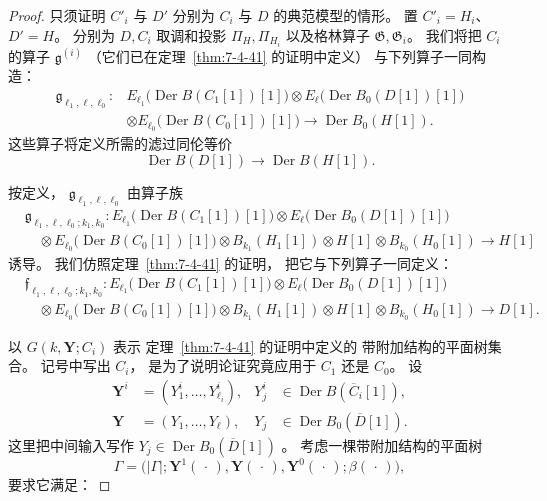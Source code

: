 \begin{proof}
只须证明 $C'_i$ 与 $D'$
分别为 $C_i$ 与 $D$ 的典范模型的情形。
置 $C'_i=H_i$、$D'=H$。
分别为 $D,C_i$ 取调和投影
$\Pi_H,\Pi_{H_i}$ 以及格林算子
$\mathfrak G,\mathfrak G_i$。
我们将把 $C_i$ 的算子
$\mathfrak g^{(i)}$
（它们已在定理~\ref{thm:7-4-41} 的证明中定义）
与下列算子一同构造：
\begin{equation}
\begin{aligned}
\mathfrak g_{\ell_1,\ell,\ell_0}\colon&
E_{\ell_1}\bigl(\operatorname{Der}B(C_1[1])[1]\bigr)
\otimes
E_\ell\bigl(\operatorname{Der}B_0(D[1])[1]\bigr)\\
&\otimes
E_{\ell_0}\bigl(\operatorname{Der}B(C_0[1])[1]\bigr)
\longrightarrow
\operatorname{Der}B_0(H[1]).
\end{aligned}
\tag{7.4.150}\label{eq:7-4-150}
\end{equation}
这些算子将定义所需的滤过同伦等价
\[
\operatorname{Der}B(D[1])
\longrightarrow
\operatorname{Der}B(H[1]).
\]

按定义，
$\mathfrak g_{\ell_1,\ell,\ell_0}$
由算子族
\begin{equation}
\begin{aligned}
&\mathfrak g_{\ell_1,\ell,\ell_0;k_1,k_0}\colon
E_{\ell_1}\bigl(\operatorname{Der}B(C_1[1])[1]\bigr)
\otimes
E_\ell\bigl(\operatorname{Der}B_0(D[1])[1]\bigr)\\
&\quad\otimes
E_{\ell_0}\bigl(\operatorname{Der}B(C_0[1])[1]\bigr)
\otimes B_{k_1}(H_1[1])
\otimes H[1]\otimes B_{k_0}(H_0[1])
\longrightarrow H[1]
\end{aligned}
\tag{7.4.151.1}\label{eq:7-4-151-1}
\end{equation}
诱导。
我们仿照定理~\ref{thm:7-4-41} 的证明，
把它与下列算子一同定义：
\begin{equation}
\begin{aligned}
&\mathfrak f_{\ell_1,\ell,\ell_0;k_1,k_0}\colon
E_{\ell_1}\bigl(\operatorname{Der}B(C_1[1])[1]\bigr)
\otimes
E_\ell\bigl(\operatorname{Der}B_0(D[1])[1]\bigr)\\
&\quad\otimes
E_{\ell_0}\bigl(\operatorname{Der}B(C_0[1])[1]\bigr)
\otimes B_{k_1}(H_1[1])
\otimes H[1]\otimes B_{k_0}(H_0[1])
\longrightarrow D[1].
\end{aligned}
\tag{7.4.151.2}\label{eq:7-4-151-2}
\end{equation}

以 $G(k,\mathbf Y;C_i)$ 表示
定理~\ref{thm:7-4-41} 的证明中定义的
带附加结构的平面树集合。
记号中写出 $C_i$，
是为了说明论证究竟应用于 $C_1$ 还是 $C_0$。
设
\[
\begin{aligned}
\mathbf Y^i
&=(Y^i_1,\ldots,Y^i_{\ell_i}),
&Y^i_j&\in
\operatorname{Der}B(\overline C_i[1]),\\
\mathbf Y
&=(Y_1,\ldots,Y_\ell),
&Y_j&\in
\operatorname{Der}B_0(\overline D[1]).
\end{aligned}
\]
这里把中间输入写作
$Y_j\in\operatorname{Der}B_0(\overline D[1])$
。
考虑一棵带附加结构的平面树
\[
\Gamma=
\bigl(
|\Gamma|;
\mathbf Y^1(\,\cdot\,),
\mathbf Y(\,\cdot\,),
\mathbf Y^0(\,\cdot\,);
\beta(\,\cdot\,)
\bigr),
\]
要求它满足：


\end{proof}
